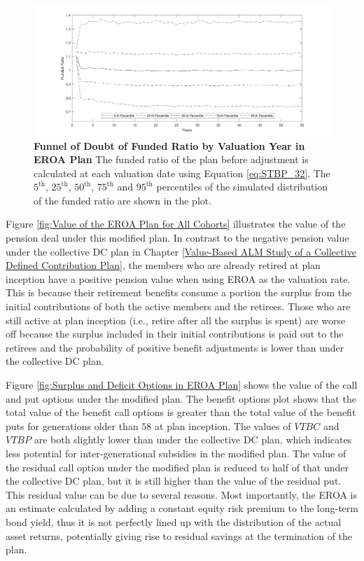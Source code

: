 \documentclass{sfuthesis}
\numberwithin{equation}{chapter}
\begin{document}
	
		\begin{figure}[h]
			\includegraphics[width=1\linewidth]{ResultPlot/FR1.pdf} 
			\caption[Funnel of Doubt of Funded Ratio by Valuation Year in EROA Plan]{\textbf{Funnel of Doubt of Funded Ratio by Valuation Year in EROA Plan}
			\newline\footnotesize\justify The funded ratio of the plan before adjustment is calculated at each valuation date using Equation \eqref{eq:STBP_32}. The $5^{\text{th}}$, $25^{\text{th}}$, $50^{\text{th}}$, $75^{\text{th}}$ and $95^{\text{th}}$ percentiles of the simulated distribution of the funded ratio are shown in the plot.}
			\label{fig:Funnel of Doubt of Funded Ratio by Valuation Year in EROA Plan}
		\end{figure}
		\vspace{-0.4cm}
		\justify
		Figure \ref{fig:Value of the EROA Plan for All Cohorts} illustrates the value of the pension deal under this modified plan. In contrast to the negative pension value under the collective DC plan in Chapter \ref{Value-Based ALM Study of a Collective Defined Contribution Plan}, the members who are already retired at plan inception have a positive pension value when using EROA as the valuation rate. This is because their retirement benefits consume a portion the surplus from the initial contributions of both the active members and the retirees. Those who are still active at plan inception (i.e., retire after all the surplus is spent) are worse off because the surplus included in their initial contributions is paid out to the retirees and the probability of positive benefit adjustments is lower than under the collective DC plan. 
	
	
		\justify
	    Figure \ref{fig:Surplus and Deficit Options in EROA Plan} shows the value of the call and put options under the modified plan. The benefit options plot shows that the total value of the benefit call options is greater than the total value of the benefit puts for generations older than $58$ at plan inception. The values of $VTBC$ and $VTBP$ are both slightly lower than under the collective DC plan, which indicates less potential for inter-generational subsidies in the modified plan. The value of the residual call option under the modified plan is reduced to half of that under the collective DC plan, but it is still higher than the value of the residual put. This residual value can be due to several reasons. Most importantly, the EROA is an estimate calculated by adding a constant equity risk premium to the long-term bond yield, thus it is not perfectly lined up with the distribution of the actual asset returns, potentially giving rise to residual savings at the termination of the plan.
    
\end{document}
